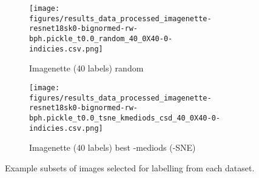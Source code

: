 \documentclass{article}
\begin{document}
\begin{figure}[p]
\begin{subfigure}[b]{0.5\textwidth}
     \end{subfigure}
     \begin{subfigure}[b]{0.5\textwidth}
         \centering
         \texttt{[image: figures/results\_data\_processed\_imagenette-resnet18sk0-bignormed-rw-bph.pickle\_t0.0\_random\_40\_0X40-0-indicies.csv.png]}
         \caption{Imagenette (40 labels) random}
         \label{fig:example_images_imagenette_random}
     \end{subfigure}
     \hfill
     \begin{subfigure}[b]{0.5\textwidth}
         \centering
         \texttt{[image: figures/results\_data\_processed\_imagenette-resnet18sk0-bignormed-rw-bph.pickle\_t0.0\_tsne\_kmediods\_csd\_40\_0X40-0-indicies.csv.png]}
         \caption{Imagenette (40 labels) best -mediods (-SNE)}
         \label{fig:example_images_imagenette_kmediods}
     \end{subfigure}
\caption{Example subsets of images selected for labelling from each dataset.}
\label{fig:example_images}
\end{figure}

\FloatBarrier
\end{document}
